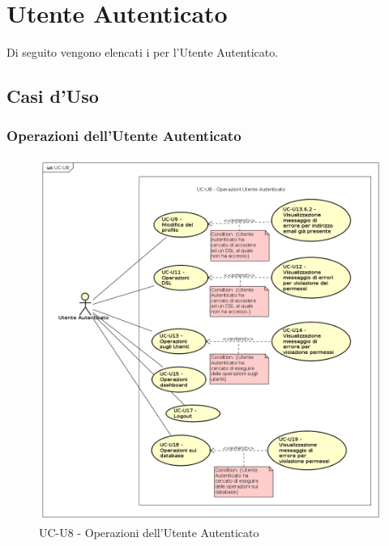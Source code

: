 \section{Utente Autenticato}

Di seguito vengono elencati i  per l'Utente Autenticato.
\subsection{Casi d'Uso}

\subsubsection{Operazioni dell'Utente Autenticato}

    \begin{figure}[H]
      \begin{center}
        \includegraphics[width=12cm]{res/img/UCUtenti/UCUtenteA/UC-U8.png}
      \caption{UC-U8 - Operazioni dell'Utente Autenticato}
      \end{center} 
    \end{figure}    
    
